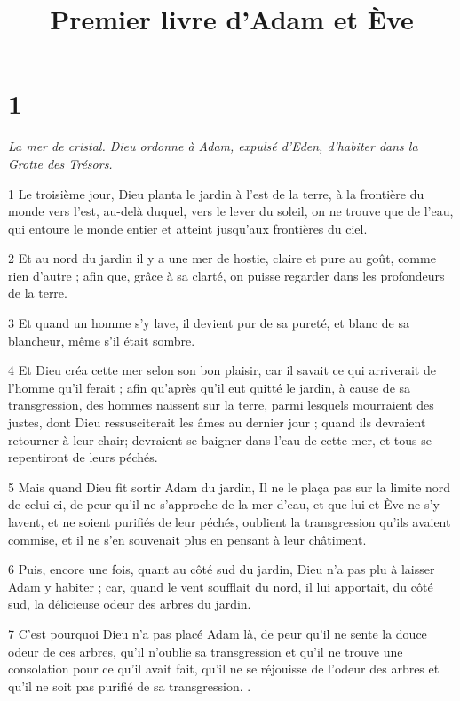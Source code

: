 

\title{Premier livre d'Adam et Ève}

\chapter{1}

\par \textit{La mer de cristal. Dieu ordonne à Adam, expulsé d'Eden, d'habiter dans la Grotte des Trésors.}

\par 1 Le troisième jour, Dieu planta le jardin à l'est de la terre, à la frontière du monde vers l'est, au-delà duquel, vers le lever du soleil, on ne trouve que de l'eau, qui entoure le monde entier et atteint jusqu'aux frontières du ciel.

\par 2 Et au nord du jardin il y a une mer de hostie, claire et pure au goût, comme rien d'autre ; afin que, grâce à sa clarté, on puisse regarder dans les profondeurs de la terre.

\par 3 Et quand un homme s'y lave, il devient pur de sa pureté, et blanc de sa blancheur, même s'il était sombre.

\par 4 Et Dieu créa cette mer selon son bon plaisir, car il savait ce qui arriverait de l'homme qu'il ferait ; afin qu'après qu'il eut quitté le jardin, à cause de sa transgression, des hommes naissent sur la terre, parmi lesquels mourraient des justes, dont Dieu ressusciterait les âmes au dernier jour ; quand ils devraient retourner à leur chair; devraient se baigner dans l'eau de cette mer, et tous se repentiront de leurs péchés.

\par 5 Mais quand Dieu fit sortir Adam du jardin, Il ne le plaça pas sur la limite nord de celui-ci, de peur qu'il ne s'approche de la mer d'eau, et que lui et Ève ne s'y lavent, et ne soient purifiés de leur péchés, oublient la transgression qu'ils avaient commise, et il ne s'en souvenait plus en pensant à leur châtiment.

\par 6 Puis, encore une fois, quant au côté sud du jardin, Dieu n'a pas plu à laisser Adam y habiter ; car, quand le vent soufflait du nord, il lui apportait, du côté sud, la délicieuse odeur des arbres du jardin.

\par 7 C'est pourquoi Dieu n'a pas placé Adam là, de peur qu'il ne sente la douce odeur de ces arbres, qu'il n'oublie sa transgression et qu'il ne trouve une consolation pour ce qu'il avait fait, qu'il ne se réjouisse de l'odeur des arbres et qu'il ne soit pas purifié de sa transgression. .

